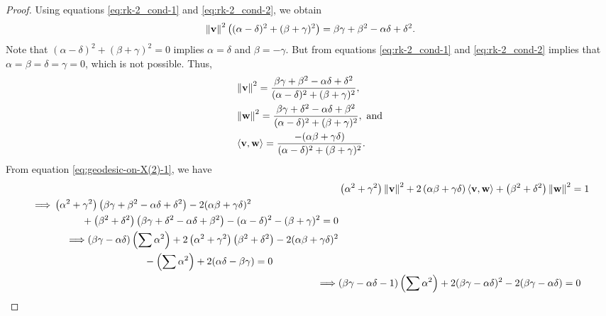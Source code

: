 \begin{proof}
	Using equations \eqref{eq:rk-2_cond-1} and \eqref{eq:rk-2_cond-2}, we obtain
	\begin{displaymath}
		 \left\|\mathbf{v}\right\|^2 \left((\alpha-\delta)^2+(\beta+\gamma)^2\right)= \beta \gamma + \beta^2 - \alpha \delta + \delta^2. 
	\end{displaymath}
	Note that $(\alpha-\delta)^2+(\beta+\gamma)^2=0$ implies $\alpha=\delta$ and $\beta=-\gamma$. But from equations \eqref{eq:rk-2_cond-1} and \eqref{eq:rk-2_cond-2} implies that $\alpha=\beta=\delta=\gamma=0$, which is not possible. Thus, 
	\begin{equation*}
		\begin{split}
			& \left\|\mathbf{v}\right\|^2 = \frac{\beta \gamma+\beta^2-\alpha \delta+\delta^2}{(\alpha-\delta)^2+(\beta+\gamma)^2},
			\\
			& \left\|\mathbf{w}\right\|^2 = \frac{\beta \gamma+\delta^2-\alpha \delta+\beta^2}{(\alpha-\delta)^2+(\beta+\gamma)^2}, \text{ and }
			\\ 
			& \left\langle \mathbf{v},\mathbf{w} \right\rangle = \frac{-(\alpha \beta+\gamma \delta)}{(\alpha-\delta)^2+(\beta+\gamma)^2}.\label{eq:v_w_and_their_innerprod}
		\end{split}
	\end{equation*}
	From equation \eqref{eq:geodesic-on-X(2)-1}, we have
	\begin{align*}
		& \left(\alpha^2+\gamma^2\right)\left\|\vbf\right\|^2 + 2 \left(\alpha \beta+\gamma \delta\right) \left\langle \vbf,\wbf \right\rangle + \left(\beta^2+\delta^2\right)\left\|\wbf\right\|^2=1 
		\\
		\begin{split}
			\implies & \left(\alpha^2+\gamma^2\right)\left(\beta \gamma+\beta^2-\alpha \delta+\delta^2\right)-2(\alpha \beta+\gamma \delta)^2 \\
			& \kern 1cm +\left(\beta^2+\delta^2\right)\left(\beta \gamma +\delta^2-\alpha \delta+\beta^2\right)- (\alpha-\delta)^2-(\beta+\gamma)^2= 0
		\end{split}
		\\ 
		\begin{split}
			\implies & (\beta \gamma-\alpha \delta)\left(\sum \alpha^2\right)+ 2 \left(\alpha^2+\gamma^2\right)\left(\beta^2+\delta^2\right)-2(\alpha \beta+\gamma \delta)^2 
			\\
			& \kern 2cm -\left(\sum \alpha^2\right)+2(\alpha \delta-\beta \gamma)=0 
		\end{split}
		\\ 
		\implies & (\beta \gamma-\alpha \delta-1)\left(\sum \alpha^2\right)+2(\beta \gamma-\alpha \delta)^2-2(\beta \gamma-\alpha \delta)=0 

\end{align*}
\end{proof}
